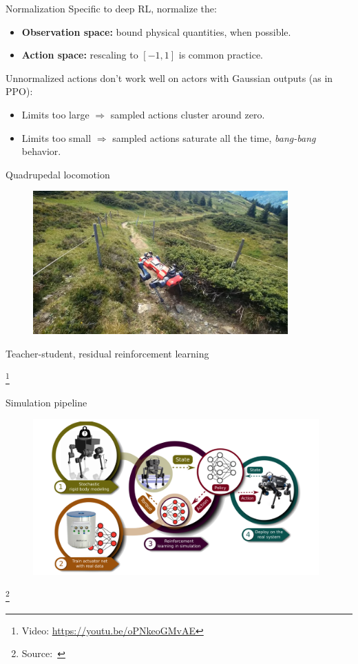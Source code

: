 \documentclass[11pt, aspectratio=169]{beamer}
\newcommand\blfootnote[1]{%
  \begingroup
  \renewcommand\thefootnote{}%
  \footnote{#1}%
  \addtocounter{footnote}{-1}%
  \endgroup
}
\begin{document}
\begin{frame}{Normalization}
    Specific to deep RL, normalize the:
    \begin{itemize}
        \item \textbf{Observation space:} bound physical quantities, when possible.
        \item \textbf{Action space:} rescaling to $[-1, 1]$ is common practice.
    \end{itemize}
    Unnormalized actions don't work well on actors with Gaussian outputs (as in PPO):
    \begin{itemize}
        \item Limits too large $\Rightarrow$ sampled actions cluster around zero.
        \item Limits too small $\Rightarrow$ sampled actions saturate all the time, \emph{bang-bang} behavior.
    \end{itemize}
\end{frame}

\begin{frame}{Quadrupedal locomotion~\cite{lee2020}}
    \vspace{1.5em}
    \begin{figure}
        \includegraphics[height=5.5cm]{figures/hike-with-anymal.jpg}
    \end{figure}
    \begin{center}
        Teacher-student, residual reinforcement learning
    \end{center}
    \blfootnote{
        Video: \url{https://youtu.be/oPNkeoGMvAE}
    }
\end{frame}

\begin{frame}{Simulation pipeline}
    \begin{figure}
        \includegraphics[height=6cm]{figures/quadruped-sim-pipeline.png}
    \end{figure}
    \blfootnote{
        Source:~\cite{hwangbo2019}
    }
\end{frame}
\end{document}
